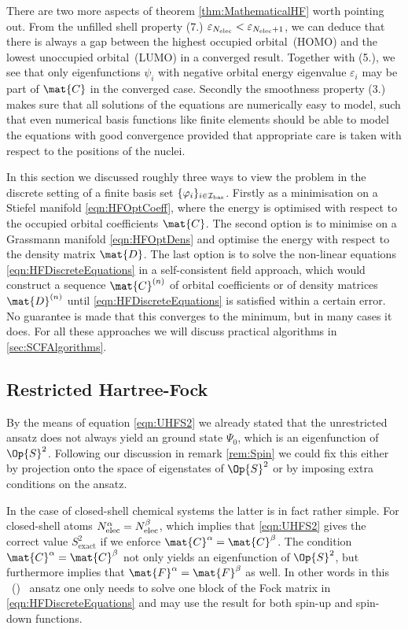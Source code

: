 \begin{rem}
There are two more aspects of theorem \ref{thm:MathematicalHF} worth pointing out.
From the unfilled shell property (7.) $\varepsilon_{N_\text{elec}} < \varepsilon_{N_\text{elec}+1}$,
we can deduce that there is always a gap between the
highest occupied orbital~(HOMO) and the lowest unoccupied orbital~(LUMO)
in a converged \HF result.
Together with (5.), we see that only eigenfunctions $\psi_i$
with negative orbital energy eigenvalue $\varepsilon_i$ may be part of $\mat{C}$
in the converged case.
Secondly the smoothness property (3.) makes sure that
all solutions of the \HF equations are numerically easy to model,
such that even numerical basis functions like finite elements
should be able to model the \HF equations with good convergence
provided that appropriate care is taken with respect to the positions of the nuclei.
\end{rem}

In this section we discussed roughly three ways to view the \HF
problem in the discrete setting of a finite basis set $\{\varphi_i\}_{i\in\mathcal{I}_\text{bas}}$.
Firstly as a minimisation on a Stiefel manifold \eqref{eqn:HFOptCoeff},
where the energy is optimised with respect to the occupied orbital coefficients
$\mat{C}$.
The second option is to minimise on a Grassmann manifold \eqref{eqn:HFOptDens}
and optimise the energy with respect to the density matrix $\mat{D}$.
The last option is to solve the non-linear \HF equations
\eqref{eqn:HFDiscreteEquations}
in a self-consistent field approach,
which would construct a sequence $\mat{C}^{(n)}$
of orbital coefficients or of density matrices $\mat{D}^{(n)}$
until \eqref{eqn:HFDiscreteEquations} is satisfied within a certain error.
No guarantee is made that this converges to the minimum,
but in many cases it does.
For all these approaches we will discuss practical
algorithms in \vref{sec:SCFAlgorithms}.

\subsection{Restricted Hartree-Fock}
By the means of equation \eqref{eqn:UHFS2}
we already stated
that the unrestricted \HF ansatz does not always
yield an \HF ground state $\Psi_0$,
which is an eigenfunction of $\Op{S}^2$.
Following our discussion in remark \vref{rem:Spin}
we could fix this either by projection onto the space of eigenstates
of $\Op{S}^2$ or by imposing extra conditions on the \HF ansatz.

In the case of closed-shell chemical systems the latter is in fact rather simple.
For closed-shell atoms $N_\text{elec}^\alpha = N_\text{elec}^\beta$,
which implies that \eqref{eqn:UHFS2}
gives the correct value $S^2_\text{exact}$ if we enforce $\mat{C}^\alpha = \mat{C}^\beta$.
The condition $\mat{C}^\alpha = \mat{C}^\beta$ not only yields
an eigenfunction of  $\Op{S}^2$,
but furthermore implies that $\mat{F}^\alpha = \mat{F}^\beta$ as well.
In other words in this
~(\RHF)~\cite{Roothaan1951}
ansatz one only needs to solve one block of the Fock matrix
in \eqref{eqn:HFDiscreteEquations} and may use the result for both
spin-up and spin-down functions.

